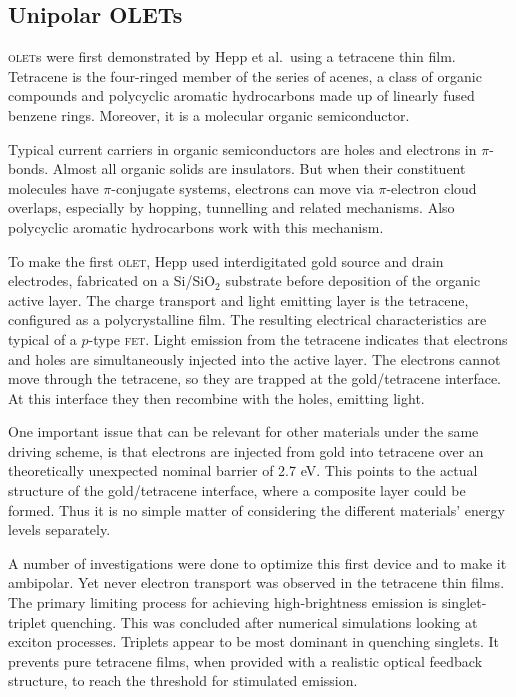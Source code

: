 \subsection{Unipolar OLETs}\label{sec:unipolar_olets} %

\textsc{olet}s were first demonstrated by Hepp et al.~using a tetracene thin film. Tetracene is the four-ringed member of the series of acenes, a class of organic compounds and polycyclic aromatic hydrocarbons made up of linearly fused benzene rings. Moreover, it is a molecular organic semiconductor.

Typical current carriers in organic semiconductors are holes and electrons in $\pi$-bonds. Almost all organic solids are insulators. But when their constituent molecules have $\pi$-conjugate systems, electrons can move via $\pi$-electron cloud overlaps, especially by hopping, tunnelling and related mechanisms. Also polycyclic aromatic hydrocarbons work with this mechanism.

To make the first \textsc{olet}, Hepp used interdigitated gold source and drain electrodes, fabricated on a Si/SiO$_2$ substrate before deposition of the organic active layer. The charge transport and light emitting layer is the tetracene, configured as a polycrystalline film. The resulting electrical characteristics are typical of a $p$-type \textsc{fet}. Light emission from the tetracene indicates that electrons and holes are simultaneously injected into the active layer. The electrons cannot move through the tetracene, so they are trapped at the gold/tetracene interface. At this interface they then recombine with the holes, emitting light.

One important issue that can be relevant for other materials under the same driving scheme, is that electrons are injected from gold into tetracene over an theoretically unexpected nominal barrier of 2.7 eV. This points to the actual structure of the gold/tetracene interface, where a composite layer could be formed. Thus it is no simple matter of considering the different materials' energy levels separately. 

A number of investigations were done to optimize this first device and to make it ambipolar. Yet never electron transport was observed in the tetracene thin films. The primary limiting process for achieving high-brightness emission is singlet-triplet quenching. This was concluded after numerical simulations looking at exciton processes. Triplets appear to be most dominant in quenching singlets. It prevents pure tetracene films, when provided with a realistic optical feedback structure, to reach the threshold for stimulated emission.

